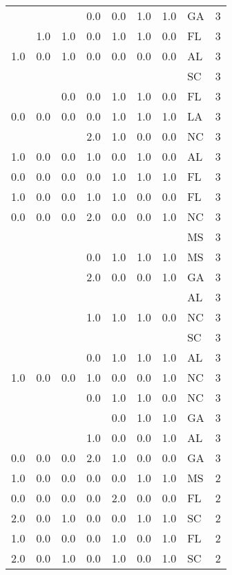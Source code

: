 \begin{tabular}{llllllllr}
    &     &     & 0.0 & 0.0 & 1.0 & 1.0 & GA &     3 \\
    & 1.0 & 1.0 & 0.0 & 1.0 & 1.0 & 0.0 & FL &     3 \\
1.0 & 0.0 & 1.0 & 0.0 & 0.0 & 0.0 & 0.0 & AL &     3 \\
    &     &     &     &     &     &     & SC &     3 \\
    &     & 0.0 & 0.0 & 1.0 & 1.0 & 0.0 & FL &     3 \\
0.0 & 0.0 & 0.0 & 0.0 & 1.0 & 1.0 & 1.0 & LA &     3 \\
    &     &     & 2.0 & 1.0 & 0.0 & 0.0 & NC &     3 \\
1.0 & 0.0 & 0.0 & 1.0 & 0.0 & 1.0 & 0.0 & AL &     3 \\
0.0 & 0.0 & 0.0 & 0.0 & 1.0 & 1.0 & 1.0 & FL &     3 \\
1.0 & 0.0 & 0.0 & 1.0 & 1.0 & 0.0 & 0.0 & FL &     3 \\
0.0 & 0.0 & 0.0 & 2.0 & 0.0 & 0.0 & 1.0 & NC &     3 \\
    &     &     &     &     &     &     & MS &     3 \\
    &     &     & 0.0 & 1.0 & 1.0 & 1.0 & MS &     3 \\
    &     &     & 2.0 & 0.0 & 0.0 & 1.0 & GA &     3 \\
    &     &     &     &     &     &     & AL &     3 \\
    &     &     & 1.0 & 1.0 & 1.0 & 0.0 & NC &     3 \\
    &     &     &     &     &     &     & SC &     3 \\
    &     &     & 0.0 & 1.0 & 1.0 & 1.0 & AL &     3 \\
1.0 & 0.0 & 0.0 & 1.0 & 0.0 & 0.0 & 1.0 & NC &     3 \\
    &     &     & 0.0 & 1.0 & 1.0 & 0.0 & NC &     3 \\
    &     &     &     & 0.0 & 1.0 & 1.0 & GA &     3 \\
    &     &     & 1.0 & 0.0 & 0.0 & 1.0 & AL &     3 \\
0.0 & 0.0 & 0.0 & 2.0 & 1.0 & 0.0 & 0.0 & GA &     3 \\
1.0 & 0.0 & 0.0 & 0.0 & 0.0 & 1.0 & 1.0 & MS &     2 \\
0.0 & 0.0 & 0.0 & 0.0 & 2.0 & 0.0 & 0.0 & FL &     2 \\
2.0 & 0.0 & 1.0 & 0.0 & 0.0 & 1.0 & 1.0 & SC &     2 \\
1.0 & 0.0 & 0.0 & 0.0 & 1.0 & 0.0 & 1.0 & FL &     2 \\
2.0 & 0.0 & 1.0 & 0.0 & 1.0 & 0.0 & 1.0 & SC &     2 \\

\end{tabular}
